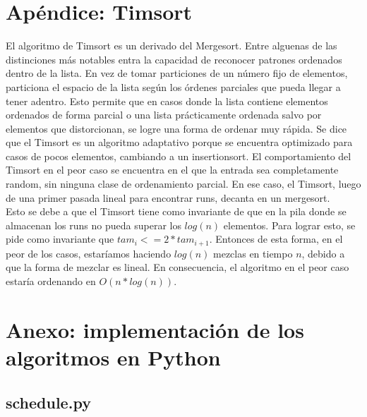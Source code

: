 \documentclass[12pt]{article}
\begin{document}
\section{Ap\'endice: Timsort}\label{timsort}
El algoritmo de Timsort es un derivado del Mergesort. Entre alguenas de las distinciones m\'as notables entra la capacidad
de reconocer patrones ordenados dentro de la lista. En vez de tomar particiones de un n\'umero fijo de elementos,
 particiona el espacio de la lista seg\'un los \'ordenes parciales que pueda llegar a tener adentro. Esto permite que en
 casos donde la lista contiene elementos ordenados de forma parcial o una lista pr\'acticamente ordenada salvo por elementos que distorcionan, se logre una forma de ordenar muy r\'apida. Se dice que el Timsort es un algoritmo adaptativo porque
se encuentra optimizado para casos de pocos elementos, cambiando a un insertionsort. El comportamiento del Timsort en el peor caso se encuentra en el que la entrada sea completamente random, sin ninguna clase de ordenamiento parcial. En ese
caso, el Timsort, luego de una primer pasada lineal para encontrar runs, decanta en un mergesort.\\
Esto se debe a que el Timsort tiene como invariante de que en la pila donde se almacenan los runs no pueda superar los 
$log(n)$ elementos. Para lograr esto, se pide como invariante que $tam_i <= 2 * tam_{i+1}$. Entonces de esta forma, en 
el peor de los casos, estar\'iamos haciendo $log(n)$ mezclas en tiempo $n$, debido a que la forma de mezclar es lineal.
En consecuencia, el algoritmo en el peor caso estar\'ia ordenando en $O(n*log(n))$.




\newpage
\section{Anexo: implementaci\'on de los algoritmos en Python}\label{codigo}
\subsection{schedule.py}

\newpage
\end{document}
